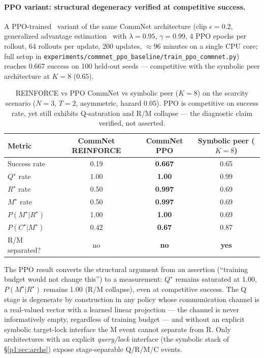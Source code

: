 \documentclass{article}
\begin{document}
\paragraph{PPO variant: structural degeneracy verified at competitive success.}
A PPO-trained~\citep{schulman2017proximal} variant of the same CommNet architecture (clip $\epsilon{=}0.2$, generalized advantage estimation~\citep{schulman2016gae} with $\lambda{=}0.95$, $\gamma{=}0.99$, 4 PPO epochs per rollout, 64 rollouts per update, 200 updates, $\approx 96$ minutes on a single CPU core; full setup in \texttt{experiments/commnet\_ppo\_baseline/train\_ppo\_commnet.py}) reaches $0.667$ success on 100 held-out seeds --- competitive with the symbolic peer architecture at $K{=}8$ ($0.65$).

\begin{table}[h]
\centering
\small
\caption{REINFORCE vs PPO CommNet vs symbolic peer ($K{=}8$) on the scarcity scenario ($N{=}3$, $T{=}2$, asymmetric, hazard $0.05$). PPO is competitive on success rate, yet still exhibits Q-saturation and R/M collapse --- the diagnostic claim verified, not asserted.}
\label{p1:tab:ppo-commnet}
\begin{tabular}{l c c c}
\toprule
Metric & CommNet REINFORCE & \textbf{CommNet PPO} & Symbolic peer ($K{=}8$) \\
\midrule
Success rate                  & 0.19   & \textbf{0.667} & 0.65 \\
$Q^\star$ rate                & 1.00   & \textbf{1.00}  & 0.99 \\
$R^\star$ rate                & 0.50   & \textbf{0.997} & 0.69 \\
$M^\star$ rate                & 0.50   & \textbf{0.997} & 0.69 \\
$P(M^\star|R^\star)$          & 1.00   & \textbf{1.00}  & 0.69 \\
$P(C^\star|M^\star)$          & 0.42   & \textbf{0.67}  & 0.87 \\
R/M separated?                & no     & \textbf{no}    & \textbf{yes} \\
\bottomrule
\end{tabular}
\end{table}

The PPO result converts the structural argument from an assertion (``training budget would not change this'') to a measurement: $Q^\star$ remains saturated at 1.00, $P(M^\star|R^\star)$ remains 1.00 (R/M collapse), even at competitive success. The Q stage is degenerate by construction in any policy whose communication channel is a real-valued vector with a learned linear projection --- the channel is never informatively empty, regardless of training budget --- and without an explicit symbolic target-lock interface the M event cannot separate from R. Only architectures with an explicit \emph{query/lock} interface (the symbolic stack of \S\ref{p1:sec:archs}) expose stage-separable Q/R/M/C events.
\end{document}
